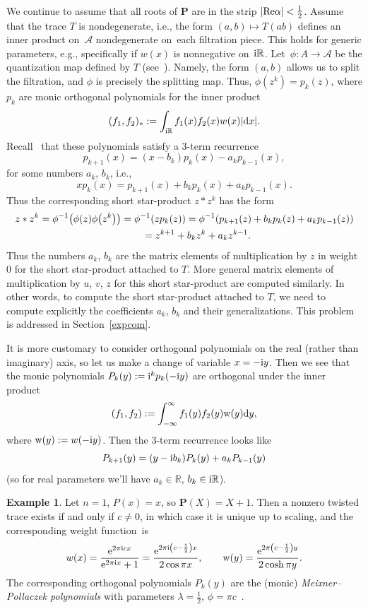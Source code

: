 \documentclass[10pt,a4paper]{amsart}
\newcommand{\mc}[1]{\mathcal{#1}}
\theoremstyle{definition}
\newtheorem{Example}[Theorem]{Example}
\numberwithin{equation}{section}
\begin{document}
We continue to assume that all roots of $\mathbf{P}$ are in the strip $|{\rm Re}\alpha|<\frac{1}{2}$. Assume that the trace $T$ is nondegenerate, i.e., the form $(a,b)\mapsto T(ab)$ defines an inner product on~$\mc A$ nondegenerate on~each filtration piece.
This holds for generic parameters, e.g., specifically if $w(x)$ is nonnegative on~${\rm i}\mathbb R$. Let~$\phi\colon A\to \mc A$ be the quantization map defined by $T$
(see~\cite[Section~3]{ES}). Namely, the form $(a,b)$ allows us to split the filtration, and $\phi$ is precisely the splitting map. Thus, $\phi(z^k)=p_k(z)$, where
$p_k$ are monic orthogonal polynomials
for the inner product
\[
(f_1,f_2)_*:=\int_{{\rm i}\mathbb R}f_1(x)f_2(x)w(x)|{\rm d}x|.
\]
Recall~\cite{Sz} that these polynomials satisfy a 3-term recurrence
\[
p_{k+1}(x)=(x-b_k)p_k(x)-a_kp_{k-1}(x),
\]
for some numbers $a_k$, $b_k$, i.e.,
\[
xp_{k}(x)=p_{k+1}(x)+b_kp_k(x)+a_kp_{k-1}(x).
\]
Thus the corresponding short star-product $z*z^k$
has the form
\begin{gather*}
z*z^k=\phi^{-1}\big(\phi(z)\phi\big(z^k\big)\big)=\phi^{-1}(zp_k(z))=
\phi^{-1}(p_{k+1}(z)+b_kp_k(z)+a_kp_{k-1}(z))
\\ \hphantom{z*z^k}
{}=z^{k+1}+b_kz^k+a_kz^{k-1}.
\end{gather*}
Thus the numbers $a_k$, $b_k$ are the matrix elements of multiplication by $z$ in weight $0$ for the short star-product attached to $T$. More general matrix elements of multiplication by $u$, $v$, $z$ for this short star-product are computed similarly. In other words, to compute the short star-product attached to $T$, we need to compute explicitly the coefficients $a_k$, $b_k$ and their generalizations. This problem
is addressed in Section~\ref{expcom}.

It is more customary to consider orthogonal polynomials on the real (rather than imaginary) axis, so let us make a change of variable $x=-{\rm i}y$.
Then we see that the monic polynomials $P_k(y):={\rm i}^{k}p_k(-{\rm i}y)$
are orthogonal under the inner product
\[
(f_1,f_2):=\int_{-\infty}^\infty f_1(y)f_2(y){\rm w}(y){\rm d}y,
\]
where ${\rm w}(y):=w(-{\rm i}y)$. Then the 3-term recurrence looks like
\[
P_{k+1}(y)=(y-{\rm i}b_k)P_k(y)+a_kP_{k-1}(y)
\]
(so for real parameters we'll have $a_k\in \mathbb R$, $b_k\in {\rm i}\mathbb R$).

\begin{Example}\label{n=1}
Let $n=1$, $P(x)=x$, so $\mathbf{P}(X)=X+1$.
Then a nonzero twisted trace exists if and only if $c\ne 0$, in which case it is unique up to scaling, and the corresponding weight func\-tion~is
\[
w(x)=\frac{{\rm e}^{2\pi {\rm i}cx}}{{\rm e}^{2\pi {\rm i}x}+1}
=\frac{{\rm e}^{2\pi {\rm i}\left(c-\frac{1}{2}\right)x}}{2\cos \pi x},\qquad
{\rm w}(y)=\frac{{\rm e}^{2\pi\left(c-\frac{1}{2}\right)y}}{2\cosh \pi y}.
\]
The corresponding orthogonal polynomials $P_k(y)$ are the (monic) {\it Meixner--Pollaczek polynomials} with parameters $\lambda=\frac{1}{2}$, $\phi=\pi c$~\cite[Section~1.7]{KS}.
\end{Example}
\end{document}
